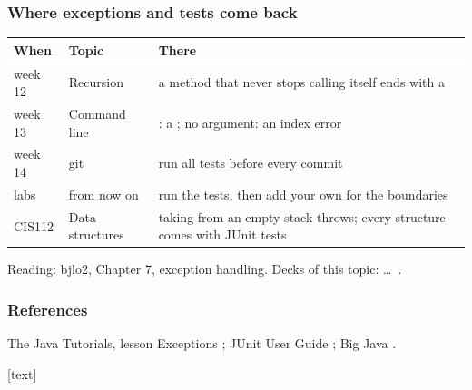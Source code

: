 \documentclass[aspectratio=169,10pt,compress]{beamer}
\begin{document}
\begin{frame}[t,fragile] \frametitle{Where exceptions and tests come back}


\begin{table}
		\small
		\begin{tabular}{@{}L{0.12\textwidth}L{0.22\textwidth}L{0.58\textwidth}@{}}
			\toprule
			\textbf{When} & \textbf{Topic} & \textbf{There} \\
			\midrule
			week 12 & Recursion         & a method that never stops calling itself ends with a  \\
			week 13 & Command line      & : a ; no argument: an index error \\
			week 14 & git               & run all tests before every commit \\
			labs    & from now on       & run the  tests, then add your own for the boundaries \\
			CIS112  & Data structures   & taking from an empty stack throws; every structure comes with JUnit tests \\
			\bottomrule
		\end{tabular}
\end{table}%


	\vspace{0.3em}
	\small Reading: bjlo2, Chapter 7, exception handling. Decks of this topic:
	 \dots\ .
\end{frame}




\begin{frame}[t,fragile] \frametitle{References}
	\small The Java Tutorials, lesson Exceptions \cite{TheJavaTutorials}; JUnit User Guide \cite{homeJunit}; Big Java \cite{horstmann2016big}.

	\vspace{1em}
	[text]
	
	\tiny
\end{frame}




\begin{frame}[t,fragile]
	\begin{center}
		\vspace{4cm}
	\end{center}
\end{frame}
\end{document}
